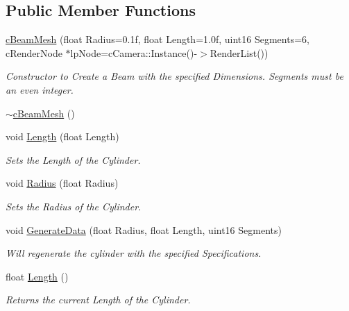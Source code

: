 \subsection*{Public Member Functions}
\begin{DoxyCompactItemize}
\item 
\hyperlink{classc_beam_mesh_afbae5a7bf74a4d0f70bc681c42d747a0}{cBeamMesh} (float Radius=0.1f, float Length=1.0f, uint16 Segments=6, cRenderNode $\ast$lpNode=cCamera::Instance()-\/$>$RenderList())
\begin{DoxyCompactList}\small\item\em Constructor to Create a Beam with the specified Dimensions. Segments must be an even integer. \item\end{DoxyCompactList}\item 
\hyperlink{classc_beam_mesh_a4b15858d14867ebda62f0602a91058bf}{$\sim$cBeamMesh} ()
\item 
void \hyperlink{classc_beam_mesh_a1d2f2bfef0e3f96597ae6e1e73072030}{Length} (float Length)
\begin{DoxyCompactList}\small\item\em Sets the Length of the Cylinder. \item\end{DoxyCompactList}\item 
void \hyperlink{classc_beam_mesh_ac11934e813765321e76405cd96304088}{Radius} (float Radius)
\begin{DoxyCompactList}\small\item\em Sets the Radius of the Cylinder. \item\end{DoxyCompactList}\item 
void \hyperlink{classc_beam_mesh_ab59d3bb8c0a5c2944a206deaca3d2022}{GenerateData} (float Radius, float Length, uint16 Segments)
\begin{DoxyCompactList}\small\item\em Will regenerate the cylinder with the specified Specifications. \item\end{DoxyCompactList}\item 
float \hyperlink{classc_beam_mesh_aa4daa383162c2560c1c5ed47d22484e5}{Length} ()
\begin{DoxyCompactList}\small\item\em Returns the current Length of the Cylinder. \item\end{DoxyCompactList}\item 

\end{DoxyCompactItemize}
